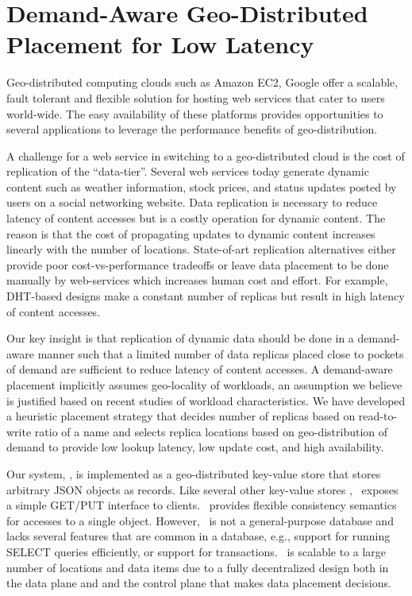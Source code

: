 \chapter{Demand-Aware Geo-Distributed Placement for Low Latency}
\label{ch:auspice}

Geo-distributed computing clouds such as Amazon EC2, Google offer a scalable, fault tolerant and flexible solution for hosting web services that cater to users world-wide. The easy availability of these platforms provides opportunities to several applications to leverage the performance benefits of geo-distribution.

A challenge for a web service in switching to a geo-distributed cloud is the cost of replication of the ``data-tier''. Several web services today generate dynamic content such as weather information, stock prices, and status updates posted by users on a social networking website. Data replication is necessary to reduce latency of content accesses but is a costly operation for dynamic content. The reason is that the cost of propagating updates to dynamic content increases linearly with the number of locations. State-of-art replication alternatives either provide poor cost-vs-performance tradeoffs or leave data placement to be done manually by web-services which increases human cost and effort. For example, DHT-based designs make a constant number of replicas but result in high latency of content accesses.


Our key insight is that replication of dynamic data should be done in a demand-aware manner such that a limited number of data replicas placed close to pockets of demand are sufficient to reduce latency of content accesses. A demand-aware placement implicitly assumes geo-locality of workloads, an assumption we believe is justified based on recent studies of workload characteristics. We have developed a heuristic placement strategy that decides number of replicas based on read-to-write ratio of a name and selects replica locations based on geo-distribution of demand to provide low lookup latency, low update cost, and high availability.


Our system, \auspice, is implemented as a geo-distributed key-value store that stores arbitrary JSON objects as records. Like several other key-value stores \cite{mongodb,Escriva,cassandra}, \auspice\ exposes a simple GET/PUT interface to clients. \auspice\ provides flexible consistency semantics for accesses to a single object. However, \auspice\ is not a general-purpose database and lacks several features that are common in a database, e.g., support for running SELECT queries efficiently, or support for transactions. 
\auspice\ is scalable to a large number of locations and data items due to a fully decentralized design both in the data plane and and the control plane that makes data placement decisions. 

